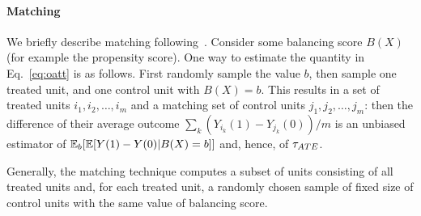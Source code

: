 \vspace{-.25cm}

\paragraph*{Matching} We briefly describe matching
following~\cite{Rubin1983b}.  Consider some balancing score $B(X)$
(for example the propensity score).  One way to estimate the quantity
in Eq.~\ref{eq:oatt} is as follows.  First randomly sample the value
$b$, then sample one treated unit, and one control unit with $B(X)=b$.
This results in a set of treated units $i_1, i_2, \ldots, i_m$ and a
matching set of control units $j_1, j_2, \ldots, j_m$: then the
difference of their average outcome
$\sum_k (Y_{i_k}(1) - Y_{j_k}(0))/m$ is an unbiased estimator of
$\mathbb{E}_b[\mathbb{E}[Y(1)-Y(0)| B(X)=b]]$ and, hence, of ${\tau_{ATE}}$.    Generally, the
matching technique computes a subset of units consisting of all
treated units and, for each treated unit, a randomly chosen sample of
fixed size of control units with the same value of balancing score.


